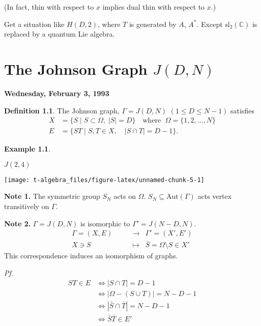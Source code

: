 \documentclass[
]{book}
\theoremstyle{definition}
\newtheorem{definition}{Definition}[chapter]
\theoremstyle{definition}
\newtheorem{example}{Example}[chapter]
\theoremstyle{definition}
\theoremstyle{definition}
\theoremstyle{remark}
\begin{document}
(In fact, thin with respect to \(x\) implies dual thin with respect to \(x\).)

Get a situation like \(H(D,2)\), where \(T\) is generated by \(A\), \(A^*\). Except \(\mathrm{sl}_2(\mathbb{C})\) is replaced by a quantum Lie algebra.

\hypertarget{lec7}{%
\chapter{\texorpdfstring{The Johnson Graph \(J(D,N)\)}{The Johnson Graph J(D,N)}}\label{lec7}}

\textbf{Wednesday, February 3, 1993}

\begin{definition}
\protect\hypertarget{def:johnson}{}\label{def:johnson}The Johnson graph, \(\Gamma = J(D,N)\) \((1\leq D\leq N-1)\) satisfies
\begin{align}
X & = \{S\mid S\subset \Omega, \; |S| = D\} \quad\text{where }\; \Omega = \{1, 2, \ldots, N\}\\
E & = \{ST\mid S, T\in X, \quad |S\cap T| = D-1\}.
\end{align}
\end{definition}

\begin{example}
\protect\hypertarget{exm:j42}{}\label{exm:j42}

\(J(2,4)\)

\begin{center}\texttt{[image: t-algebra\_files/figure-latex/unnamed-chunk-5-1]} \end{center}

\end{example}

\textbf{Note 1.}
The symmetric group \(S_N\) acts on \(\Omega\). \(S_N \subseteq \mathrm{Aut}(\Gamma)\) acts vertex transitively on \(\Gamma\).

\textbf{Note 2.}
\(\Gamma = J(D,N)\) is isomorphic to \(\Gamma' = J(N-D,N)\).
\begin{align}
\Gamma = (X, E) & \qquad \longrightarrow & \Gamma' = (X', E')\\
X\ni S & \qquad \longmapsto & \bar{S} = \Omega\setminus S \in X'
\end{align}
This correspondence induces an isomorphism of graphs.

\emph{Pf.}
\begin{align}
ST\in E & \Leftrightarrow  |S\cap T| = D-1\\
  & \Leftrightarrow  |\Omega - (S\cup T)| = N-D-1\\
  & \Leftrightarrow  |\bar{S} \cap \bar{T}| = N-D-1\\
  & \Leftrightarrow  \bar{S}\bar{T} \in E'
\end{align}
\end{document}
